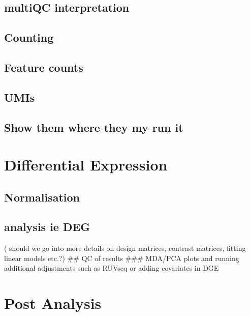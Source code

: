 \documentclass[
]{book}
\begin{document}
\hypertarget{multiqc-interpretation-1}{%
\section{multiQC interpretation}\label{multiqc-interpretation-1}}

\hypertarget{counting}{%
\section{Counting}\label{counting}}

\hypertarget{feature-counts}{%
\section{Feature counts}\label{feature-counts}}

\hypertarget{umis}{%
\section{UMIs}\label{umis}}

\hypertarget{show-them-where-they-my-run-it}{%
\section{Show them where they my run it}\label{show-them-where-they-my-run-it}}

\hypertarget{differential-expression}{%
\chapter{Differential Expression}\label{differential-expression}}

\hypertarget{normalisation}{%
\section{Normalisation}\label{normalisation}}

\hypertarget{analysis-ie-deg}{%
\section{analysis ie DEG}\label{analysis-ie-deg}}

( should we go into more details on design matrices, contrast matrices, fitting linear models etc.?)
\#\# QC of results
\#\#\# MDA/PCA plots and running additional adjustments such as RUVseq or adding covariates in DGE

\hypertarget{post-analysis}{%
\chapter{Post Analysis}\label{post-analysis}}
\end{document}
